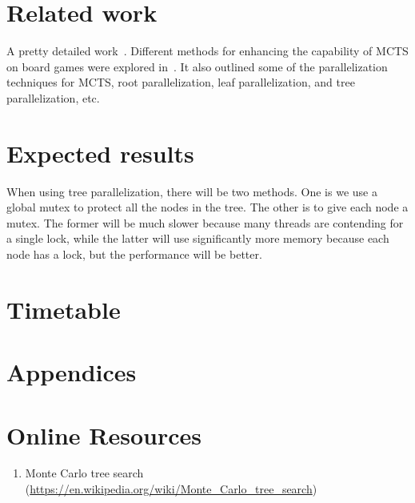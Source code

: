 \documentclass[sigconf]{acmart}
\begin{document}
\section{Related work}

A pretty detailed work~\cite{liu2020effective}. Different methods for enhancing the capability of MCTS on board games were explored in~\cite{weigel2017monte}. It also outlined some of the parallelization techniques for MCTS, root parallelization, leaf parallelization, and tree parallelization, etc.

\section{Expected results}
When using tree parallelization, there will be two methods. One is we use a global mutex to protect all the nodes in the tree. The other is to give each node a mutex. The former will be much slower because many threads are contending for a single lock, while the latter will use significantly more memory because each node has a lock, but the performance will be better. 



\section{Timetable}





\section{Appendices}



\appendix

\section{Online Resources}
\begin{enumerate}
  \item Monte Carlo tree search (\url{https://en.wikipedia.org/wiki/Monte_Carlo_tree_search})
\end{enumerate}
\end{document}
